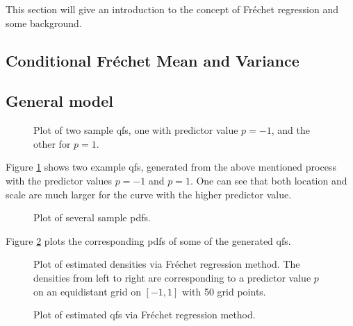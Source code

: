 This section will give an introduction to the concept of Fréchet regression
and some background.

\subsection{Conditional Fréchet Mean and Variance}
\label{sec:condmean}

\subsection{General model}
\label{sec:general}

\begin{figure}[h]
    \centering
    \resizebox{1\textwidth}{!}{}
    \caption[Two sample qfs]{Plot of two sample qfs, one with predictor value $p = -1$,
    and the other for $p = 1$.}
    \label{fig:1stlastqf}
\end{figure}

Figure \ref{fig:1stlastqf} shows two example qfs, generated from the above mentioned
process with the predictor values $p=-1$ and $p=1$. One can see that both location and
scale are much larger for the curve with the higher predictor value.

\begin{figure}[h]
    \centering
    \resizebox{1\textwidth}{!}{}
    \caption[Several sampled pdfs]{Plot of several sample pdfs.}
    \label{fig:some_densities}
\end{figure}

Figure \ref{fig:some_densities} plots the corresponding pdfs of some of the generated qfs.

\begin{figure}[h]
    \centering
    \resizebox{1\textwidth}{!}{}
    \caption[Estimated pdfs from Fréchet method]{Plot of estimated densities via Fréchet regression method.
    The densities from left to right are corresponding to a predictor value $p$ on an
    equidistant grid on $[-1,1]$ with 50 grid points.}
    \label{fig:frechet_estimates}
\end{figure}

\begin{figure}[h]
    \centering
    \resizebox{1\textwidth}{!}{}
    \caption[Estimated qfs from Fréchet method]{Plot of estimated qfs via Fréchet regression method.}
    \label{fig:frechet_estimates_3d}
\end{figure}

